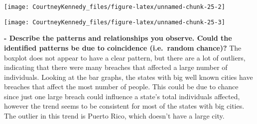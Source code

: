 \documentclass[
]{article}
\newenvironment{Shaded}{\begin{snugshade}}{\end{snugshade}}
\newcommand{\AttributeTok}[1]{\textcolor[rgb]{0.77,0.63,0.00}{#1}}
\newcommand{\FunctionTok}[1]{\textcolor[rgb]{0.00,0.00,0.00}{#1}}
\newcommand{\NormalTok}[1]{#1}
\newcommand{\OtherTok}[1]{\textcolor[rgb]{0.56,0.35,0.01}{#1}}
\newcommand{\SpecialCharTok}[1]{\textcolor[rgb]{0.00,0.00,0.00}{#1}}
\newcommand{\StringTok}[1]{\textcolor[rgb]{0.31,0.60,0.02}{#1}}
\begin{document}
\begin{center}\texttt{[image: CourtneyKennedy\_files/figure-latex/unnamed-chunk-25-2]} \end{center}

\begin{Shaded}
\end{Shaded}

\begin{center}\texttt{[image: CourtneyKennedy\_files/figure-latex/unnamed-chunk-25-3]} \end{center}

\textbf{- Describe the patterns and relationships you observe. Could the
identified patterns be due to coincidence (i.e.~random chance)?} The
boxplot does not appear to have a clear pattern, but there are a lot of
outliers, indicating that there were many breaches that affected a large
number of individuals. Looking at the bar graphs, the states with big
well known cities have breaches that affect the most number of people.
This could be due to chance since just one large breach could influence
a state's total individuals affected, however the trend seems to be
consistent for most of the states with big cities. The outlier in this
trend is Puerto Rico, which doesn't have a large city.
\end{document}
